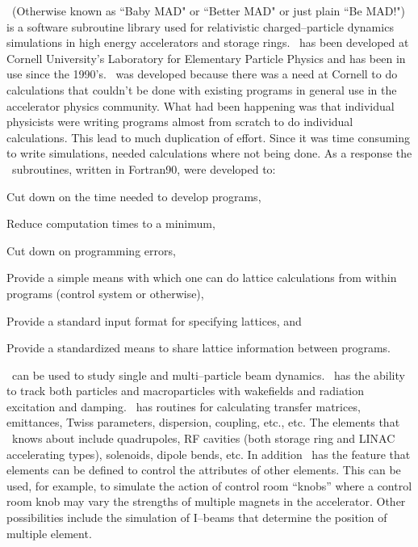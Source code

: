 
\bmad\ (Otherwise known as ``Baby MAD" or ``Better MAD" or just plain
``Be MAD!")  is a software subroutine library used for relativistic
charged--particle dynamics simulations in high energy accelerators and
storage rings. \bmad\ has been developed at Cornell University's
Laboratory for Elementary Particle Physics and has been in use since the
1990's. \bmad\ was developed because there was a need at Cornell to do
calculations that couldn't be done with existing programs in general use
in the accelerator physics community. What had been happening 
was that individual physicists were writing programs almost from scratch 
to do individual calculations. This lead to much duplication of effort.
Since it was time consuming to write simulations, needed calculations where
not being done. As a response the \bmad\ subroutines, written in
Fortran90, were developed to:
\begin{Itemize}
\item Cut down on the time needed to develop programs,
\item Reduce computation times to a minimum,
\item Cut down on programming errors, 
\item Provide a simple means with which one can do lattice calculations 
from within programs (control system or otherwise),
\item Provide a standard input format for specifying lattices, and
\item Provide a standardized means to share lattice information between 
programs.
\end{Itemize}

\bmad\ can be used to study single and multi--particle beam dynamics.
\bmad\ has the ability to track both particles and macroparticles with
wakefields and radiation excitation and damping. \bmad\ has routines for
calculating transfer matrices, emittances, Twiss parameters, dispersion,
coupling, etc., etc. The elements that \bmad\ knows about include
quadrupoles, RF cavities (both storage ring and LINAC accelerating
types), solenoids, dipole bends, etc. In addition \bmad\ has the feature
that elements can be defined to control the attributes of other
elements. This can be used, for example, to simulate the action of
control room ``knobs'' where a control room knob may vary the strengths
of multiple magnets in the accelerator. Other possibilities include
the simulation of I--beams that determine the position of multiple
element.

\vfill
\break
